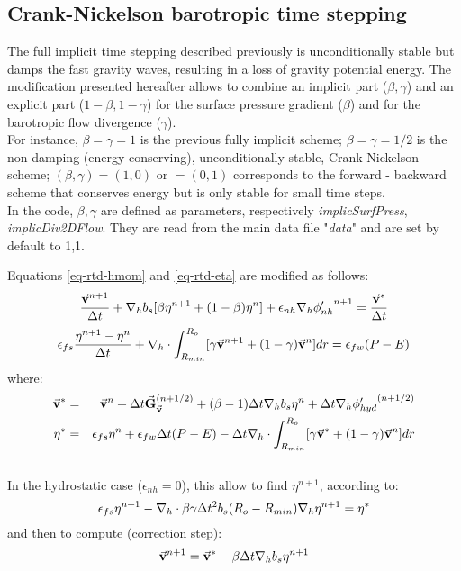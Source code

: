 \newpage
\subsection{Crank-Nickelson barotropic time stepping}

The full implicit time stepping described previously is unconditionally stable
but damps the fast gravity waves, resulting in a loss of 
gravity potential energy.
The modification presented hereafter allows to combine an implicit part
($\beta,\gamma$) and an explicit part ($1-\beta,1-\gamma$) for the surface
pressure gradient ($\beta$) and for the barotropic flow divergence ($\gamma$).
\\
For instance, $\beta=\gamma=1$ is the previous fully implicit scheme;
$\beta=\gamma=1/2$ is the non damping (energy conserving), unconditionally
stable, Crank-Nickelson scheme; $(\beta,\gamma)=(1,0)$ or $=(0,1)$
corresponds to the forward - backward scheme that conserves energy but is
only stable for small time steps.\\
In the code, $\beta,\gamma$ are defined as parameters, respectively 
{\it implicSurfPress}, {\it implicDiv2DFlow}. They are read from
the main data file "{\it data}" and are set by default to 1,1.

Equations \ref{eq-rtd-hmom} and \ref{eq-rtd-eta} are modified as follows:
$$
\frac{ \vec{\bf v}^{n+1} }{ \Delta t }
+ {\bf \nabla}_h b_s [ \beta {\eta}^{n+1} + (1-\beta) {\eta}^{n} ] 
+ \epsilon_{nh} {\bf \nabla}_h {\phi'_{nh}}^{n+1}
 = \frac{ \vec{\bf v}^* }{ \Delta t }
$$
$$
\epsilon_{fs} \frac{ {\eta}^{n+1} - {\eta}^{n} }{ \Delta t}
+ {\bf \nabla}_h \cdot \int_{R_{min}}^{R_o} 
[ \gamma \vec{\bf v}^{n+1} + (1-\gamma) \vec{\bf v}^{n}] dr
= \epsilon_{fw} (P-E)
$$
where:
\begin{eqnarray*}
\vec{\bf v}^* & = &
\vec{\bf v} ^{n} + \Delta t \vec{\bf G}_{\vec{\bf v}} ^{(n+1/2)}
+ (\beta-1) \Delta t {\bf \nabla}_h b_s {\eta}^{n}
+ \Delta t {\bf \nabla}_h {\phi'_{hyd}}^{(n+1/2)}
\\
{\eta}^* & = &
\epsilon_{fs} {\eta}^{n} + \epsilon_{fw} \Delta t (P-E) 
- \Delta t {\bf \nabla}_h \cdot \int_{R_{min}}^{R_o} 
[ \gamma \vec{\bf v}^* + (1-\gamma) \vec{\bf v}^{n}] dr
\end{eqnarray*}
\\
In the hydrostatic case ($\epsilon_{nh}=0$),
this allow to find ${\eta}^{n+1}$, according to:
$$
\epsilon_{fs} {\eta}^{n+1} -
{\bf \nabla}_h \cdot \beta\gamma \Delta t^2 b_s (R_o - R_{min})
{\bf \nabla}_h {\eta}^{n+1}
= {\eta}^*
$$ 
and then to compute (correction step):
$$
\vec{\bf v}^{n+1} = \vec{\bf v}^{*}
- \beta \Delta t {\bf \nabla}_h b_s {\eta}^{n+1}
$$

